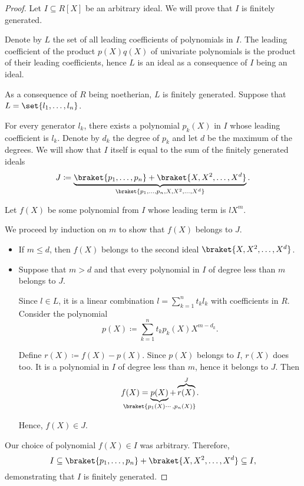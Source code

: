 \begin{proof}
  Let \( I \subseteq R[X] \) be an arbitrary ideal. We will prove that \( I \) is finitely generated.

  Denote by \( L \) the set of all leading coefficients of polynomials in \( I \). The leading coefficient of the product \( p(X) q(X) \) of univariate polynomials is the product of their leading coefficients, hence \( L \) is an ideal as a consequence of \( I \) being an ideal.

  As a consequence of \( R \) being noetherian, \( L \) is finitely generated. Suppose that \( L = \set{ l_1, \ldots, l_n } \).

  For every generator \( l_k \), there exists a polynomial \( p_k(X) \) in \( I \) whose leading coefficient is \( l_k \). Denote by \( d_k \) the degree of \( p_k \) and let \( d \) be the maximum of the degrees. We will show that \( I \) itself is equal to the sum of the finitely generated ideals
  \begin{equation*}
    J \coloneqq \underbrace{ \braket{ p_1, \ldots, p_n } + \braket{ X, X^2, \ldots, X^d } }_{ \braket{ p_1, \ldots, p_n, X, X^2, \ldots, X^d } }.
  \end{equation*}

  Let \( f(X) \) be some polynomial from \( I \) whose leading term is \( l X^m \).

  We proceed by induction on \( m \) to show that \( f(X) \) belongs to \( J \).
  \begin{itemize}
    \item If \( m \leq d \), then \( f(X) \) belongs to the second ideal \( \braket{ X, X^2, \ldots, X^d } \).

    \item Suppose that \( m > d \) and that every polynomial in \( I \) of degree less than \( m \) belongs to \( J \).

    Since \( l \in L \), it is a linear combination \( l = \sum_{k=1}^n t_k l_k \) with coefficients in \( R \). Consider the polynomial
    \begin{equation*}
      p(X) \coloneqq \sum_{k=1}^n t_k p_k(X) X^{m - d_k}.
    \end{equation*}

    Define \( r(X) \coloneqq f(X) - p(X) \). Since \( p(X) \) belongs to \( I \), \( r(X) \) does too. It is a polynomial in \( I \) of degree less than \( m \), hence it belongs to \( J \). Then
    \begin{equation*}
      f(X) = \underbrace{ p(X) }_{\mathclap{\braket{ p_1(X) \cdots, p_n(X) }}} + \overbrace{ r(X) }^J.
    \end{equation*}

    Hence, \( f(X) \in J \).
  \end{itemize}

  Our choice of polynomial \( f(X) \in I \) was arbitrary. Therefore,
  \begin{equation*}
    I \subseteq \braket{ p_1, \ldots, p_n } + \braket{ X, X^2, \ldots, X^d } \subseteq I,
  \end{equation*}
  demonstrating that \( I \) is finitely generated.
\end{proof}

